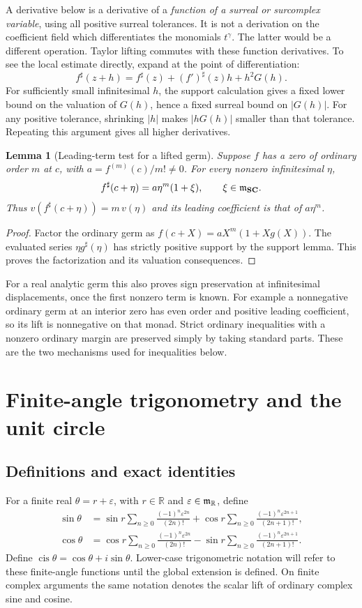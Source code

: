 \documentclass[11pt,letterpaper]{article}
\newtheorem{lemma}[theorem]{Lemma}
\theoremstyle{definition}
\theoremstyle{remark}
\newcommand{\SC}{\mathbf{SC}}
\newcommand{\R}{\mathbb R}\newcommand{\C}{\mathbb C}
\newcommand{\sh}{^{\sharp}}
\newcommand{\cis}{\operatorname{cis}}
\numberwithin{equation}{section}
\begin{document}
A derivative below is a derivative of a \emph{function of a surreal or surcomplex variable}, using all positive surreal tolerances. It is not a derivation on the coefficient field which differentiates the monomials $t^\gamma$. The latter would be a different operation. Taylor lifting commutes with these function derivatives. To see the local estimate directly, expand at the point of differentiation:
\[
 f\sh(z+h)=f\sh(z)+(f')\sh(z)h+h^2G(h).
\]
For sufficiently small infinitesimal $h$, the support calculation gives a fixed lower bound on the valuation of $G(h)$, hence a fixed surreal bound on $|G(h)|$. For any positive tolerance, shrinking $|h|$ makes $|hG(h)|$ smaller than that tolerance. Repeating this argument gives all higher derivatives.

\begin{lemma}[Leading-term test for a lifted germ]\label{lem:leading}
Suppose $f$ has a zero of ordinary order $m$ at $c$, with $a=f^{(m)}(c)/m!\ne0$. For every nonzero infinitesimal $\eta$,
\[
 f\sh(c+\eta)=a\eta^m(1+\xi),\qquad \xi\in\mm_{\SC}.
\]
Thus $v(f\sh(c+\eta))=m\,v(\eta)$ and its leading coefficient is that of $a\eta^m$.
\end{lemma}
\begin{proof}
Factor the ordinary germ as $f(c+X)=aX^m(1+Xg(X))$. The evaluated series $\eta g\sh(\eta)$ has strictly positive support by the support lemma. This proves the factorization and its valuation consequences.
\end{proof}
For a real analytic germ this also proves sign preservation at infinitesimal displacements, once the first nonzero term is known. For example a nonnegative ordinary germ at an interior zero has even order and positive leading coefficient, so its lift is nonnegative on that monad. Strict ordinary inequalities with a nonzero ordinary margin are preserved simply by taking standard parts. These are the two mechanisms used for inequalities below.

\section{Finite-angle trigonometry and the unit circle}\label{sec:finite}
\subsection{Definitions and exact identities}
For a finite real $\theta=r+\varepsilon$, with $r\in\R$ and $\varepsilon\in\mm_{\R}$, define
\begin{align}\label{eq:finitesin}
 \sin\theta&=\sin r\sum_{n\ge0}\frac{(-1)^n\varepsilon^{2n}}{(2n)!}
 +\cos r\sum_{n\ge0}\frac{(-1)^n\varepsilon^{2n+1}}{(2n+1)!},\\
 \cos\theta&=\cos r\sum_{n\ge0}\frac{(-1)^n\varepsilon^{2n}}{(2n)!}
 -\sin r\sum_{n\ge0}\frac{(-1)^n\varepsilon^{2n+1}}{(2n+1)!}.\nonumber
\end{align}
Define $\cis\theta=\cos\theta+i\sin\theta$. Lower-case trigonometric notation will refer to these finite-angle functions until the global extension is defined. On finite complex arguments the same notation denotes the scalar lift of ordinary complex sine and cosine.
\end{document}
